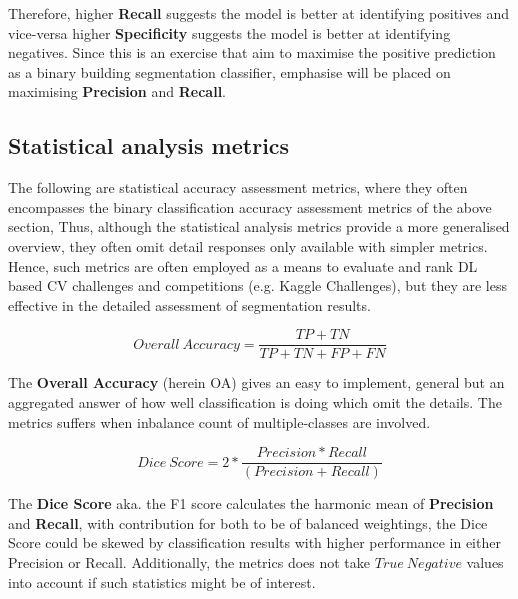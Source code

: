 \documentclass[11pt, a4paper, twoside]{report}
\begin{document}
Therefore, higher \textbf{Recall} suggests the model is better at identifying positives and vice-versa higher \textbf{Specificity} suggests the model is better at identifying negatives. Since this is an exercise that aim to maximise the positive prediction as a binary building segmentation classifier, emphasise will be placed on maximising \textbf{Precision} and \textbf{Recall}.\\\par

\subsection{Statistical analysis metrics}\label{2ndorder}

The following are statistical accuracy assessment metrics, where they often encompasses the binary classification accuracy assessment metrics of the above section, Thus, although the statistical analysis metrics provide a more generalised overview, they often omit detail responses only available with simpler metrics. Hence, such metrics are often employed as a means to evaluate and rank DL based CV challenges and competitions (e.g. Kaggle Challenges), but they are less effective in the detailed assessment of segmentation results.\\\par

\begin{equation}
  Overall\ Accuracy = \frac{TP + TN}{TP + TN + FP + FN}
\end{equation}

The \textbf{Overall Accuracy} (herein OA) gives an easy to implement, general but an aggregated answer of how well classification is doing which omit the details. The metrics suffers when inbalance count of multiple-classes are involved.\\\par

\begin{equation}
  Dice\ Score = 2 * \frac{Precision * Recall}{(Precision + Recall)}
\end{equation}

The \textbf{Dice Score} aka. the F1 score calculates the harmonic mean of \textbf{Precision} and \textbf{Recall}, with contribution for both to be of balanced weightings, the Dice Score could be skewed by classification results with higher performance in either Precision or Recall. Additionally, the metrics does not take $True\ Negative$ values into account if such statistics might be of interest.\\\par
\end{document}
